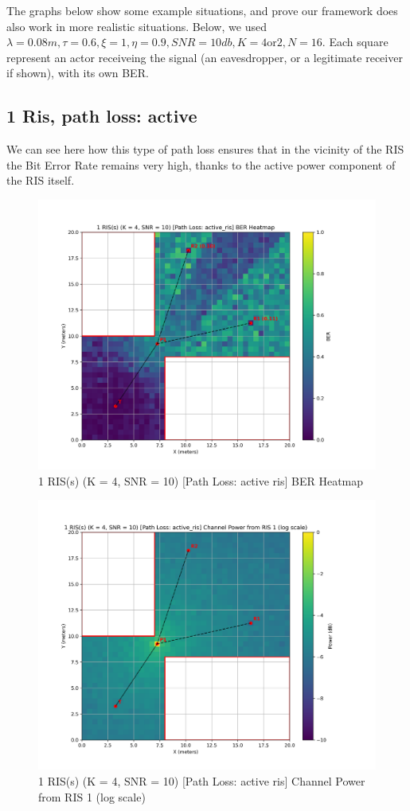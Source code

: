 The graphs below show some example situations, and prove our framework does also work in more realistic situations. Below, we used $\lambda = 0.08m, \tau = 0.6, \xi = 1, \eta = 0.9, SNR = 10db, K = 4 \text{or} 2, N = 16$. Each square represent an actor receiveing the signal (an eavesdropper, or a legitimate receiver if shown), with its own BER.

\newpage
\subsection*{1 Ris, path loss: active}

We can see here how this type of path loss ensures that in the vicinity of the RIS the Bit Error Rate remains very high, thanks to the active power component of the RIS itself.

\begin{figure}[H]
  \centering
  \includegraphics[width=0.45\linewidth]{imgs/heatmap-simulations/1 RIS(s) (K = 4, SNR = 10) [Path Loss_ active_ris] BER Heatmap.png}
  \caption{1 RIS(s) (K = 4, SNR = 10) [Path Loss: active ris] BER Heatmap}
\end{figure}

\begin{figure}[H]
  \centering
  \includegraphics[width=0.45\linewidth]{imgs/heatmap-simulations/1 RIS(s) (K = 4, SNR = 10) [Path Loss_ active_ris] Channel Power from RIS 1 (log scale).png}
  \caption{1 RIS(s) (K = 4, SNR = 10) [Path Loss: active ris] Channel Power from RIS 1 (log scale)}
\end{figure}

